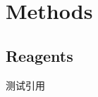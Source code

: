 \chapter{Methods}

\section{Reagents}

测试引用\citep{zhang2017whole,wickersham2007monosynaptic,huang1974differential}